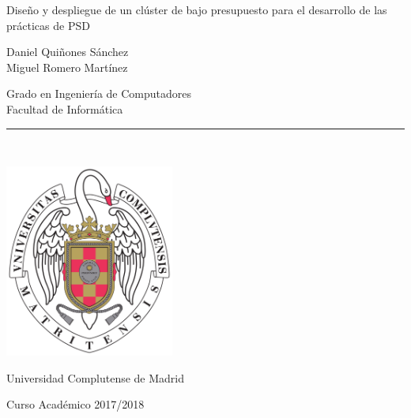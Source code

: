 \begin{center}

   \vspace{1cm}


   {\Large Diseño y despliegue de un clúster de
bajo presupuesto para el desarrollo de
las prácticas de PSD
}\\

   \vspace{0.5cm}



   \vspace{0.5cm}



   {\large Daniel Quiñones Sánchez}\\
   {\large Miguel Romero Martínez}\\

   \vspace{0.5cm}



   Grado en Ingeniería de Computadores\\
   Facultad de Informática\\ 


   \vspace{0.65cm}
   \rule{2in}{0.5pt}\\
   \vspace{0.85cm}

  \includegraphics[height=2.5in]{pics/escudo.png}
  

   \vspace{0.5cm}
   Universidad Complutense de Madrid \\
   \vspace{0.5cm}






  Curso Académico 2017/2018\\
   \vspace{1cm}

\end{center}

